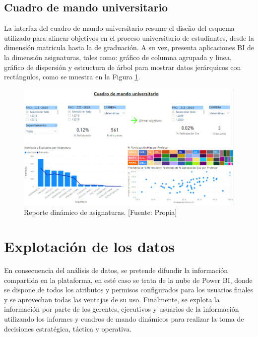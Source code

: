 \documentclass[11pt,titlepage]{report}
\begin{document}
\subsection{Cuadro de mando universitario}
La interfaz del cuadro de mando universitario resume el diseño del esquema utilizado para alinear objetivos en el proceso universitario de estudiantes, desde la dimensión matricula hasta la de graduación. A su vez, presenta aplicaciones BI de la dimensión asignaturas, tales como: gráfico de columna agrupada y linea, gráfico de dispersión y estructura de árbol para mostrar datos jerárquicos con rectángulos, como se muestra en la Figura \ref{fig: cuadroMando}.\\

\begin{figure}[h]
	\centering
	\includegraphics[width=1\linewidth]{Figuras/cuadroMando}
	\caption{Reporte dinámico de asignaturas. [Fuente: Propia]}
	\label{fig: cuadroMando}
\end{figure}



\section{Explotación de los datos}

En consecuencia del análisis de datos, se pretende difundir la información compartida en la plataforma, en esté caso se trata de la nube de Power BI, donde se dispone de todos los atributos y permisos configurados para los usuarios finales y se aprovechan todas las ventajas de su uso. Finalmente, se explota la información por parte de los gerentes, ejecutivos y usuarios de la información utilizando los informes y cuadros de mando dinámicos para realizar la toma de decisiones estratégica, táctica y operativa.
\end{document}
